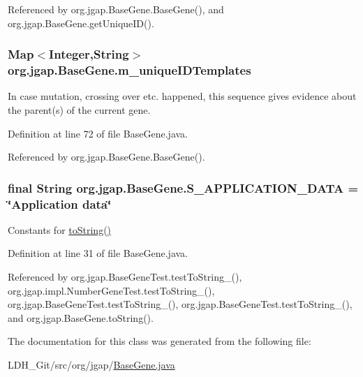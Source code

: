 Referenced by org.\-jgap.\-Base\-Gene.\-Base\-Gene(), and org.\-jgap.\-Base\-Gene.\-get\-Unique\-I\-D().

\hypertarget{classorg_1_1jgap_1_1_base_gene_a3f14fef3c7107830f24306cf7bb0abf0}{
\subsubsection[{m\-\_\-unique\-I\-D\-Templates}]{\setlength{\rightskip}{0pt plus 5cm}Map$<$Integer,String$>$ org.\-jgap.\-Base\-Gene.\-m\-\_\-unique\-I\-D\-Templates\hspace{0.3cm}{\ttfamily [private]}}}\label{classorg_1_1jgap_1_1_base_gene_a3f14fef3c7107830f24306cf7bb0abf0}
In case mutation, crossing over etc. happened, this sequence gives evidence about the parent(s) of the current gene. 

Definition at line 72 of file Base\-Gene.\-java.



Referenced by org.\-jgap.\-Base\-Gene.\-Base\-Gene().

\hypertarget{classorg_1_1jgap_1_1_base_gene_acc4b1c46f3508b835bf95b9058eae3a0}{
\subsubsection[{S\-\_\-\-A\-P\-P\-L\-I\-C\-A\-T\-I\-O\-N\-\_\-\-D\-A\-T\-A}]{\setlength{\rightskip}{0pt plus 5cm}final String org.\-jgap.\-Base\-Gene.\-S\-\_\-\-A\-P\-P\-L\-I\-C\-A\-T\-I\-O\-N\-\_\-\-D\-A\-T\-A = \char`\"{}Application data\char`\"{}\hspace{0.3cm}{\ttfamily [static]}}}\label{classorg_1_1jgap_1_1_base_gene_acc4b1c46f3508b835bf95b9058eae3a0}
Constants for \hyperlink{classorg_1_1jgap_1_1_base_gene_a935dfec06cb77bff0d2a45859d6a35b7}{to\-String()} 

Definition at line 31 of file Base\-Gene.\-java.



Referenced by org.\-jgap.\-Base\-Gene\-Test.\-test\-To\-String\-\_(), org.\-jgap.\-impl.\-Number\-Gene\-Test.\-test\-To\-String\-\_(), org.\-jgap.\-Base\-Gene\-Test.\-test\-To\-String\-\_(), org.\-jgap.\-Base\-Gene\-Test.\-test\-To\-String\-\_(), and org.\-jgap.\-Base\-Gene.\-to\-String().



The documentation for this class was generated from the following file\-:\begin{DoxyCompactItemize}
\item 
L\-D\-H\-\_\-\-Git/src/org/jgap/\hyperlink{_base_gene_8java}{Base\-Gene.\-java}\end{DoxyCompactItemize}

